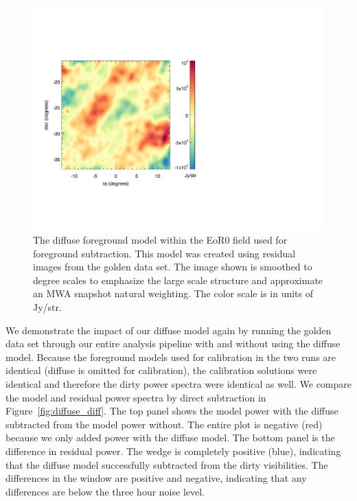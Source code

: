 \documentclass[iop]{emulateapj}
\begin{document}
\begin{figure}
\begin{center}
\includegraphics[width=\columnwidth]{diffuse_sky.pdf}
\caption[Diffuse model used for subtraction]{
The diffuse foreground model within the EoR0 field used for foreground subtraction. This 
model was created using residual images from the golden data set. The image shown is 
smoothed to degree scales to emphasize the large scale structure and approximate an 
MWA snapshot natural weighting. The color scale is in units of Jy/str.
\label{fig:diffuse}
}
\end{center}
\end{figure}

We demonstrate the impact of our diffuse model again by running the golden data set 
through our entire analysis pipeline with and without using the diffuse model. Because the 
foreground models used for calibration in the two runs are identical (diffuse is omitted for 
calibration), the calibration solutions were identical and therefore the dirty power spectra 
were identical as well. We compare the model and residual power spectra by direct 
subtraction in Figure~\ref{fig:diffuse_diff}. The top panel shows the model power with the 
diffuse subtracted from the model power without. The entire plot is negative (red) because 
we only added power with the diffuse model. The bottom panel is the difference in residual 
power. The wedge is completely positive (blue), indicating that the diffuse model 
successfully subtracted from the dirty visibilities. The differences in the window are positive 
and negative, indicating that any differences are below the three hour noise level.  
\end{document}
